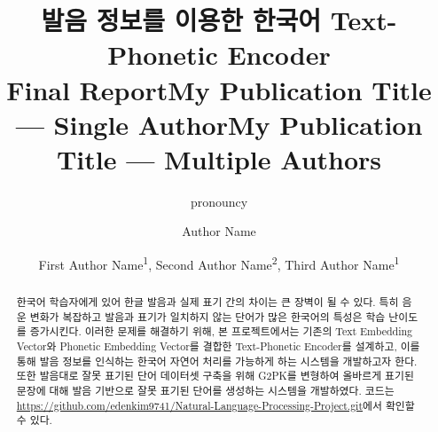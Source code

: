 \documentclass[letterpaper]{article} %
\title{발음 정보를 이용한 한국어 Text-Phonetic Encoder \\
        \normalsize Final Report}
\author{
    pronouncy
}
\title{My Publication Title --- Single Author}
\author {
    Author Name
}
\title{My Publication Title --- Multiple Authors}
\author {
    First Author Name\textsuperscript{\rm 1},
    Second Author Name\textsuperscript{\rm 2},
    Third Author Name\textsuperscript{\rm 1}
}
\begin{document}
\maketitle

\begin{abstract}
    한국어 학습자에게 있어 한글 발음과 실제 표기 간의 차이는 큰 장벽이 될 수 있다.
    특히 음운 변화가 복잡하고 발음과 표기가 일치하지 않는 단어가 많은 한국어의 특성은 학습 난이도를 증가시킨다. 이러한 문제를 해결하기 위해, 본 프로젝트에서는 기존의 Text Embedding Vector와 Phonetic Embedding Vector를 결합한 Text-Phonetic Encoder를 설계하고, 이를 통해 발음 정보를 인식하는 한국어 자연어 처리를 가능하게 하는 시스템을 개발하고자 한다.
    또한 발음대로 잘못 표기된 단어 데이터셋 구축을 위해 G2PK\cite{park2019g2pk}를 변형하여 올바르게 표기된 문장에 대해 발음 기반으로 잘못 표기된 단어를 생성하는 시스템을 개발하였다.
    코드는 \url{https://github.com/edenkim9741/Natural-Language-Processing-Project.git}에서 확인할 수 있다.
\end{abstract}

%
\end{document}
